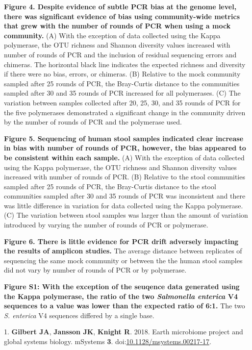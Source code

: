 \documentclass[11,]{article}
\begin{document}
\textbf{Figure 4. Despite evidence of subtle PCR bias at the genome
level, there was significant evidence of bias using community-wide
metrics that grew with the number of rounds of PCR when using a mock
community.} (A) With the exception of data collected using the Kappa
polymerase, the OTU richness and Shannon diversity values increased with
number of rounds of PCR and the inclusion of residual sequencing errors
and chimeras. The horizontal black line indicates the expected richness
and diversity if there were no bias, errors, or chimeras. (B) Relative
to the mock community sampled after 25 rounds of PCR, the Bray-Curtis
distance to the communities sampled after 30 and 35 rounds of PCR
increased for all polymerases. (C) The variation between samples
collected after 20, 25, 30, and 35 rounds of PCR for the five
polymerases demonstrated a significant change in the community driven by
the number of rounds of PCR and the polymerase used.

\textbf{Figure 5. Sequencing of human stool samples indicated clear
increase in bias with number of rounds of PCR, however, the bias
appeared to be consistent within each sample.} (A) With the exception of
data collected using the Kappa polymerase, the OTU richness and Shannon
diversity values increased with number of rounds of PCR. (B) Relative to
the stool communities sampled after 25 rounds of PCR, the Bray-Curtis
distance to the stool communities sampled after 30 and 35 rounds of PCR
was inconsistent and there was little difference in variation for data
collected using the Kappa polymerase. (C) The variation between stool
samples was larger than the amount of variation introduced by varying
the number of rounds of PCR or polymerase.

\textbf{Figure 6. There is little evidence for PCR drift adversely
impacting the results of amplicon studies.} The average distance between
replicates of sequencing the same mock community or between the the
human stool samples did not vary by number of rounds of PCR or by
polymerase.

\newpage

\textbf{Figure S1: With the exception of the seuqence data generated
using the Kappa polymerase, the ratio of the two \emph{Salmonella
enterica} V4 sequences to a value was lower than the expected ratio of
6:1.} The two \emph{S. enterica} V4 sequences differed by a single base.

\newpage

1. \textbf{Gilbert JA}, \textbf{Jansson JK}, \textbf{Knight R}. 2018.
Earth microbiome project and global systems biology. mSystems
\textbf{3}.
doi:\href{http://dx.doi.org/10.1128/msystems.00217-17}{10.1128/msystems.00217-17}.
\end{document}
